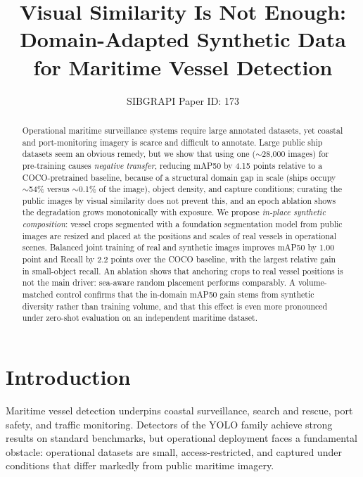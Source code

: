 \documentclass[10pt,conference]{IEEEtran}
\newif\iffinal
\newcommand{\cmtid}{173} %
\begin{document}
\title{Visual Similarity Is Not Enough: Domain-Adapted Synthetic Data \\ for Maritime Vessel Detection}

\iffinal
\author{\IEEEauthorblockN{Anonymous Authors}
\IEEEauthorblockA{Anonymous Institution}}
\else
  \author{SIBGRAPI Paper ID: \cmtid \\ }
  \linenumbers
\fi

\maketitle

\begin{abstract}
Operational maritime surveillance systems require large annotated datasets, yet
coastal and port-monitoring imagery is scarce and difficult to annotate. Large
public ship datasets seem an obvious remedy, but we show that using one
($\sim$28{,}000 images) for pre-training causes \emph{negative transfer},
reducing mAP50 by 4.15 points relative to a COCO-pretrained baseline, because of
a structural domain gap in scale (ships occupy $\sim$54\% versus $\sim$0.1\% of the
image), object density, and capture conditions; curating the public images by
visual similarity does not prevent this, and an epoch ablation shows the
degradation grows monotonically with exposure. We propose \emph{in-place
synthetic composition}: vessel crops segmented with a foundation segmentation
model from public images are resized and placed at the positions and scales of
real vessels in operational scenes. Balanced joint training of real and
synthetic images improves mAP50 by 1.00 point and Recall by 2.2 points over the
COCO baseline, with the largest relative gain in small-object recall. An ablation
shows that anchoring crops to real vessel positions is not the main driver:
sea-aware random placement performs comparably. A volume-matched control confirms that the in-domain mAP50 gain stems from synthetic diversity rather than training volume, and that this effect is even more pronounced under zero-shot evaluation on an independent maritime dataset.
\end{abstract}

\IEEEpeerreviewmaketitle

\section{Introduction}
Maritime vessel detection underpins coastal surveillance, search and rescue,
port safety, and traffic monitoring. Detectors of the YOLO family
\cite{redmon2016you,jocher2023ultralytics} achieve strong results on standard
benchmarks, but operational deployment faces a fundamental obstacle: operational
datasets are small, access-restricted, and captured under conditions that differ
markedly from public maritime imagery.
\end{document}
